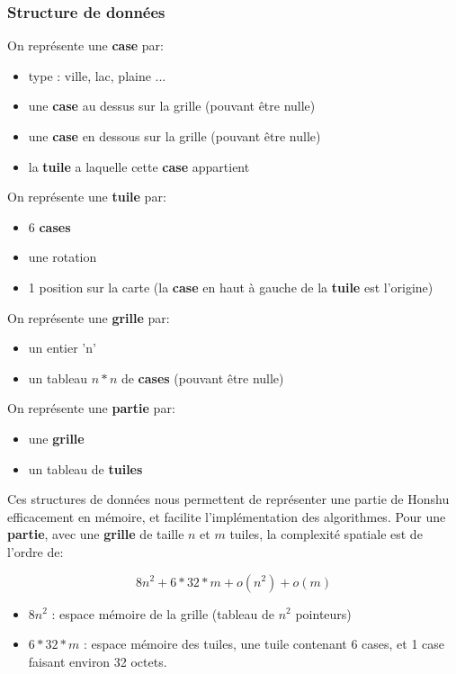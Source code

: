 \documentclass[10pt]{article}
\begin{document}
			\subsubsection{Structure de données}
				On représente une \textbf{case} par:
				\begin{itemize}[label=-]
					\item type : ville, lac, plaine ...
					\item une \textbf{case} au dessus sur la grille (pouvant être nulle)
					\item une \textbf{case} en dessous sur la grille (pouvant être nulle)
					\item la \textbf{tuile} a laquelle cette \textbf{case} appartient
				\end{itemize}
				On représente une \textbf{tuile} par:
				\begin{itemize}[label=-]
					\item 6 \textbf{cases}
					\item une rotation
					\item 1 position sur la carte (la \textbf{case} en haut à gauche de la \textbf{tuile} est l'origine)
				\end{itemize}
				On représente une \textbf{grille} par:
				\begin{itemize}[label=-]
					\item un entier 'n'
					\item un tableau $n*n$ de \textbf{cases} (pouvant être nulle)
				\end{itemize}
				On représente une \textbf{partie} par:
				\begin{itemize}[label=-]
					\item une \textbf{grille}
					\item un tableau de \textbf{tuiles}
				\end{itemize}
				
				Ces structures de données nous permettent de représenter une partie de Honshu efficacement en mémoire,
				et facilite l'implémentation des algorithmes. Pour une \textbf{partie}, avec une \textbf{grille} de taille $n$
				et $m$ tuiles, la complexité spatiale est de l'ordre de:
				
				\[ 8n^2 + 6 * 32 * m + o(n^2) + o(m) \]
								
				\begin{itemize}[label=-]
					\item $8n^2$ : espace mémoire de la grille (tableau de $n^2$ pointeurs)
					\item $6 * 32 * m$ : espace mémoire des tuiles, une tuile contenant 6 cases, et 1 case faisant environ 32 octets.
				\end{itemize}
\end{document}
